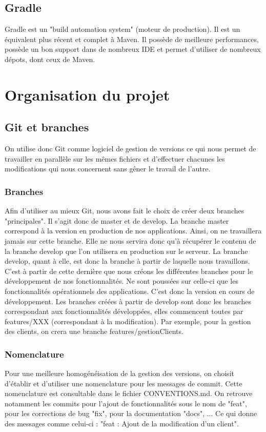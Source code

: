 		\subsection{Gradle}
			Gradle est un "build automation system" (moteur de production). Il est un équivalent plus récent et complet à Maven. Il possède de meilleure performances, possède un bon support dans de nombreux IDE et permet d'utiliser de nombreux dépots, dont ceux de Maven.

	\section{Organisation du projet}
		\subsection{Git et branches}
			On utilise donc Git comme logiciel de gestion de versions ce qui nous permet de travailler en parallèle sur les mêmes fichiers et d'effectuer chacunes les modifications qui nous concernent sans gêner le travail de l'autre.
			\subsubsection{Branches}
				Afin d'utiliser au mieux Git, nous avons fait le choix de créer deux branches "principales". Il s'agit donc de master et de develop.
				La branche master correspond à la version en production de nos applications. Ainsi, on ne travaillera jamais sur cette branche. Elle ne nous servira donc qu'à récupérer le contenu de la branche develop que l'on utilisera en production sur le serveur.
				La branche develop, quant à elle, est donc la branche à partir de laquelle nous travaillons. C'est à partir de cette dernière que nous créons les différentes branches pour le développement de nos fonctionnalités. Ne sont poussées sur celle-ci que les fonctionnalités opérationnels des applications. C'est donc la version en cours de développement.
				Les branches créées à partir de develop sont donc les branches correspondant aux fonctionnalités développées, elles commencent toutes par features/XXX (correspondant à la modification). Par exemple, pour la gestion des clients, on crera une branche features/gestionClients.

			\subsubsection{Nomenclature}
				Pour une meilleure homogénéisation de la gestion des versions, on choisit d'établir et d'utiliser une nomenclature pour les messages de commit. Cette nomenclature est consultable dans le fichier CONVENTIONS.md.
				On retrouve notamment les commits pour l'ajout de fonctionnalités sous le nom de "feat", pour les corrections de bug "fix", pour la documentation "docs", ...
				Ce qui donne des messages comme celui-ci : "feat : Ajout de la modification d'un client".


